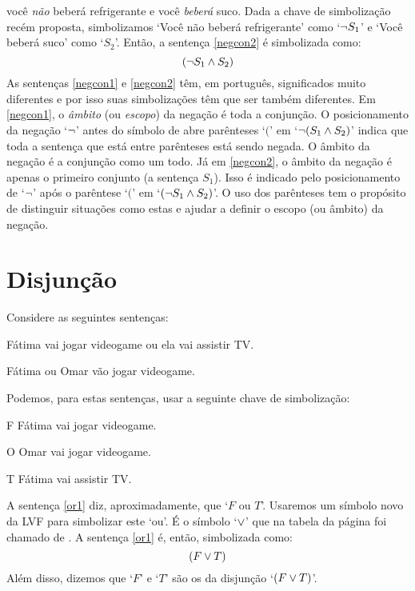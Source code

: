 você \emph{não} beberá refrigerante e você \emph{beberá} suco.
Dada a chave de simbolização recém proposta, simbolizamos `Você não beberá refrigerante' como `$\neg S_1$' e `Você beberá suco' como `$S_2$'.
Então, a sentença \ref{negcon2} é simbolizada como:
$$(\neg S_1 \wedge S_2)$$
As sentenças \ref{negcon1} e \ref{negcon2} têm, em português, significados muito diferentes e por isso suas simbolizações têm que ser também diferentes.
Em \ref{negcon1}, o \emph{âmbito} (ou \emph{escopo}) da negação é toda a conjunção.
O posicionamento da negação `$\neg$' antes do símbolo de abre parênteses `$($'  em `$\neg(S_1 \wedge S_2)$' indica que toda a sentença que está entre parênteses está sendo negada. O âmbito da negação é a conjunção como um todo.
Já em \ref{negcon2}, o âmbito da negação é apenas o primeiro conjunto (a sentença $S_1$).
Isso é indicado pelo posicionamento de `$\neg$' após o parêntese `$($' em `$(\neg S_1 \wedge S_2)$'.
O uso dos parênteses tem o propósito de distinguir situações como estas e ajudar a definir o escopo (ou âmbito) da negação.


\section{Disjunção}

Considere as seguintes sentenças:
	\begin{earg}
		\item[\ex{or1}]Fátima vai jogar videogame ou ela vai assistir TV.
		\item[\ex{or2}]Fátima ou Omar vão jogar videogame. 
	\end{earg}
Podemos, para estas sentenças, usar a seguinte chave de simbolização:
	\begin{ekey}
		\item[F] Fátima vai jogar videogame.
		\item[O] Omar vai jogar videogame.
		\item[T] Fátima vai assistir TV.
	\end{ekey}
A sentença \ref{or1} diz, aproximadamente, que `$F$ ou $T$'.
Usaremos um símbolo novo da LVF para simbolizar este `ou'.
É o símbolo `$\vee$' que na tabela da página \pageref{table:TFLConnectives} foi chamado de . 
A sentença \ref{or1} é, então, simbolizada como:
$$(F \vee T)$$
Além disso, dizemos que `$F$' e `$T$' são os  da disjunção `$(F \vee T)$'.

